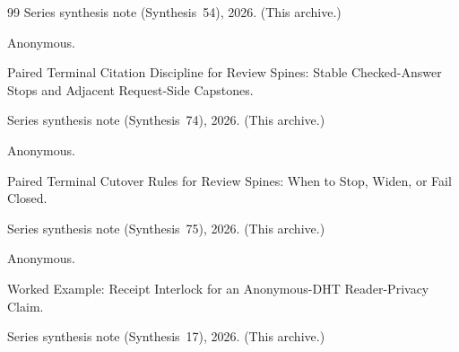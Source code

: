 \documentclass[11pt]{article}
\begin{document}
\begin{thebibliography}{99}
\newblock Series synthesis note (Synthesis~54), 2026. (This archive.)

Anonymous.

\newblock Paired Terminal Citation Discipline for Review Spines: Stable Checked-Answer Stops and Adjacent Request-Side Capstones.

\newblock Series synthesis note (Synthesis~74), 2026. (This archive.)

Anonymous.

\newblock Paired Terminal Cutover Rules for Review Spines: When to Stop, Widen, or Fail Closed.

\newblock Series synthesis note (Synthesis~75), 2026. (This archive.)

Anonymous.

\newblock Worked Example: Receipt Interlock for an Anonymous-DHT Reader-Privacy Claim.

\newblock Series synthesis note (Synthesis~17), 2026. (This archive.)

\end{thebibliography}
\end{document}
